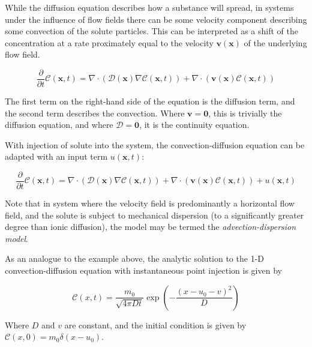 \documentclass[11pt]{article}
\begin{document}
While the diffusion equation describes how a substance will spread, in
systems under the influence of flow fields there can be some velocity
component describing some convection of the solute particles. This can
be interpreted as a shift of the concentration at a rate proximately
equal to the velocity \(\mathbf{v}(\mathbf{x})\) of the underlying flow
field.

\[
    \frac{\partial}{\partial t}\mathcal{C}(\mathbf{x},t) = \nabla\cdot\left(\mathcal{D}(\mathbf{x})\nabla \mathcal{C}(\mathbf{x},t)\right) + \nabla\cdot\left(\mathbf{v}(\mathbf{x})\mathcal{C}(\mathbf{x}, t)\right)
\]

The first term on the right-hand side of the equation is the diffusion
term, and the second term describes the convection. Where
\(\mathbf{v} = \mathbf{0}\), this is trivially the diffusion equation,
and where \(\mathcal{D} = \mathbf{0}\), it is the continuity equation.

With injection of solute into the system, the convection-diffusion
equation can be adapted with an input term \(u(\mathbf{x}, t)\):

\[
    \frac{\partial}{\partial t}\mathcal{C}(\mathbf{x},t) = \nabla\cdot\left(\mathcal{D}(\mathbf{x})\nabla \mathcal{C}(\mathbf{x},t)\right) + \nabla\cdot\left(\mathbf{v}(\mathbf{x})\mathcal{C}(\mathbf{x}, t)\right) + u(\mathbf{x}, t)
\]

Note that in system where the velocity field is predominantly a
horizontal flow field, and the solute is subject to mechanical
dispersion (to a significantly greater degree than ionic diffusion), the
model may be termed the \emph{advection-dispersion model}.

    As an analogue to the example above, the analytic solution to the 1-D
convection-diffusion equation with instantaneous point injection is
given by

\[
    \mathcal{C}(x,t) = \frac{m_0}{\sqrt{4\pi Dt}}\exp\left(-\frac{(x-u_0 - v)^2}{D}\right)
\]

Where \(D\) and \(v\) are constant, and the initial condition is given
by \(\mathcal{C}(x, 0) = m_0\delta(x - u_0)\).
\end{document}
